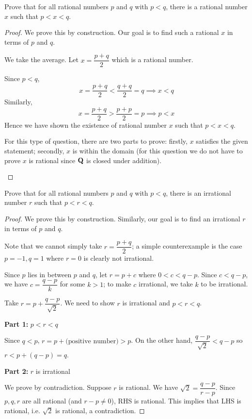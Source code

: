 \begin{exercise}
Prove that for all rational numbers $p$ and $q$ with $p<q$, there is a rational number $x$ such that $p<x<q$.
\end{exercise}
\begin{proof}
We prove this by construction. Our goal is to find such a rational $x$ in terms of $p$ and $q$.

We take the average. Let $x=\dfrac{p+q}{2}$ which is a rational number.

Since $p<q$, 
\[ x=\frac{p+q}{2}<\frac{q+q}{2}=q \implies x<q \]
Similarly,
\[ x=\frac{p+q}{2}>\frac{p+p}{2}=p \implies p<x \]
Hence we have shown the existence of rational number $x$ such that $p<x<q$.

\begin{remark}
For this type of question, there are two parts to prove: firstly, $x$ satisfies the given statement; secondly, $x$ is within the domain (for this question we do not have to prove $x$ is rational since $\mathbf Q$ is closed under addition).
\end{remark}
\end{proof}

\begin{exercise}
Prove that for all rational numbers $p$ and $q$ with $p<q$, there is an irrational number $r$ such that $p<r<q$.
\end{exercise}
\begin{proof}
We prove this by construction. Similarly, our goal is to find an irrational $r$ in terms of $p$ and $q$.

Note that we cannot simply take $r=\dfrac{p+q}{2}$; a simple counterexample is the case $p=-1,q=1$ where $r=0$ is clearly not irrational.

Since $p$ lies in between $p$ and $q$, let $r=p+c$ where $0<c<q-p$. Since $c<q-p$, we have $c=\dfrac{q-p}{k}$ for some $k>1$; to make $c$ irrational, we take $k$ to be irrational.

Take $r=p+\dfrac{q-p}{\sqrt{2}}$. We need to show $r$ is irrational and $p<r<q$.

\textbf{Part 1:} $p<r<q$

Since $q<p$, $r=p+\text{(positive number)}>p$. On the other hand, $\dfrac{q-p}{\sqrt{2}}<q-p$ so $r<p+(q-p)=q$.

\textbf{Part 2:} $r$ is irrational

We prove by contradiction. Suppose $r$ is rational. We have $\sqrt{2}=\dfrac{q-p}{r-p}$. Since $p,q,r$ are all rational (and $r-p\neq0$), RHS is rational. This implies that LHS is rational, i.e. $\sqrt{2}$ is rational, a contradiction.
\end{proof}


